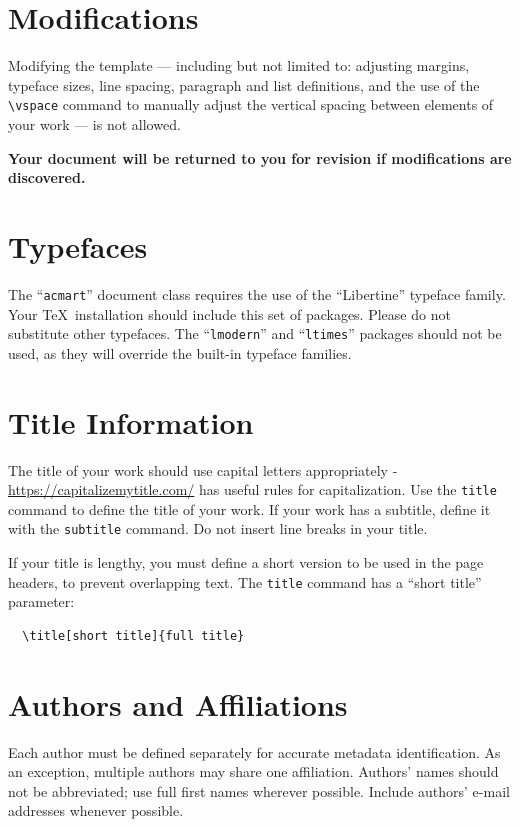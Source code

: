 \section{Modifications}

Modifying the template --- including but not limited to: adjusting
margins, typeface sizes, line spacing, paragraph and list definitions,
and the use of the \verb|\vspace| command to manually adjust the
vertical spacing between elements of your work --- is not allowed.

{\bfseries Your document will be returned to you for revision if
  modifications are discovered.}

\section{Typefaces}

The ``\verb|acmart|'' document class requires the use of the
``Libertine'' typeface family. Your \TeX\ installation should include
this set of packages. Please do not substitute other typefaces. The
``\verb|lmodern|'' and ``\verb|ltimes|'' packages should not be used,
as they will override the built-in typeface families.

\section{Title Information}

The title of your work should use capital letters appropriately -
\url{https://capitalizemytitle.com/} has useful rules for
capitalization. Use the {\verb|title|} command to define the title of
your work. If your work has a subtitle, define it with the
{\verb|subtitle|} command.  Do not insert line breaks in your title.

If your title is lengthy, you must define a short version to be used
in the page headers, to prevent overlapping text. The \verb|title|
command has a ``short title'' parameter:
\begin{verbatim}
  \title[short title]{full title}
\end{verbatim}

\section{Authors and Affiliations}

Each author must be defined separately for accurate metadata
identification.  As an exception, multiple authors may share one
affiliation. Authors' names should not be abbreviated; use full first
names wherever possible. Include authors' e-mail addresses whenever
possible.

